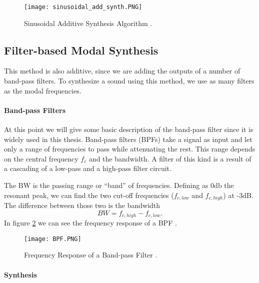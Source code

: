 \begin{figure}[H]
  \centering
    \texttt{[image: sinusoidal\_add\_synth.PNG]}
      \caption{Sinusoidal Additive Synthesis Algorithm \cite{Cook:2002:RSS:515316}.}
      \label{fig:sin_add_synth}
\end{figure}

\subsection{Filter-based Modal Synthesis}\label{sec:add_synth}

This method is also additive, since we are adding the outputs of a number of band-pass filters. To synthesize a sound using this method, we use as many filters as the modal frequencies.

\paragraph{Band-pass Filters\\}\label{par:bpf}

At this point we will give some basic description of the band-pass filter since it is widely used in this thesis. Band-pass filters (\gls{BPF}s) take a signal as input and let only a range of frequencies to pass while attenuating the rest. This range depends on the central frequency $f_c$ and the bandwidth. A filter of this kind is a result of a cascading of a low-pass and a high-pass filter circuit.

The \gls{BW} is the passing range or ``band'' of frequencies. Defining as 0db the resonant peak, we can find the two cut-off frequencies ($f_{c,low}$ and $f_{c,high}$) at -3dB. The difference between those two is the bandwidth  
\begin{equation}\label{eq:bw}
BW = f_{c,high}-f_{c,low}.
\end{equation}   
In figure \ref{fig:resp_bpf} we can see the frequency response of a BPF \cite{bib:bpf}. 

\begin{figure}[H]
  \centering
    \texttt{[image: BPF.PNG]}
      \caption{Frequency Response of a Band-pass Filter  \cite{bib:bpf}.}
      \label{fig:resp_bpf}
\end{figure}

\paragraph{Synthesis\\}\label{par:synth}

